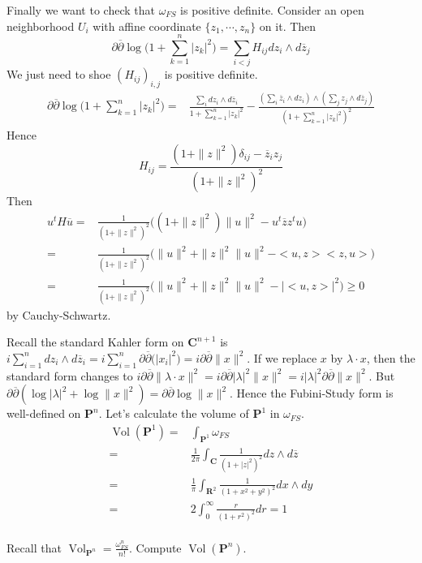 \documentclass[
11pt, %
letterpaper， %
oneside, %
headinclude,footinclude, %
BCOR5mm, %
]{scrartcl}
\newcommand{\R}{{\mathbf{R}}}
\newcommand{\C}{{\mathbf{C}}}
\newcommand{\cp}{{\mathbf{P}}}
\newcommand{\vol}{\operatorname{Vol}}
\begin{document}
\begin{ex}
Finally we want to check that $\omega_{FS}$ is positive definite. Consider an open neighborhood $U_i$ with affine coordinate $\{z_1,\cdots, z_n \}$ on it. Then 
\begin{equation*}
\partial \overline{\partial} \log \big(1+ \sum_{k=1}^{n}|z_k|^2 \big)=\sum_{i<j} H_{ij} dz_i\wedge d\overline{z}_j
\end{equation*}
We just need to shoe $(H_{ij})_{i,j}$ is positive definite.
\begin{align*}
\partial \overline{\partial} \log \big(1+ \sum_{k=1}^{n}|z_k|^2 \big)=& \frac{\sum_i dz_i\wedge d\overline{z}_i }{1+ \sum_{k=1}^{n}|z_k|^2}-\frac{(\sum_i \overline{z}_i\wedge dz_i)\wedge(\sum_j z_j\wedge d\overline{z}_j) }{(1+ \sum_{k=1}^{n}|z_k|^2)^2}
\end{align*}
Hence \begin{equation*}
 H_{ij}=\frac{(1+\|z\|^2)\delta_{ij}-\overline{z}_iz_j}{(1+\|z\|^2)^2}
\end{equation*}
Then \begin{align*}
u^t H \overline{u}=& \frac{1}{(1+\|z\|^2)^2}\big((1+\|z\|^2)\|u\|^2-u^t\overline{z}z^tu \big)\\
=&\frac{1}{(1+\|z\|^2)^2}\big(\|u\|^2+\|z\|^2\|u\|^2-<u,z><z,u> \big)\\
=&\frac{1}{(1+\|z\|^2)^2}\big(\|u\|^2+\|z\|^2\|u\|^2-|<u,z>|^2 \big)\ge 0
\end{align*}
by Cauchy-Schwartz.

\end{ex}
Recall the standard Kahler form on $\C^{n+1}$ is $i\sum_{i=1}^n dz_i\wedge d\overline{z}_i=i\sum_{i=1}^n \partial \overline{\partial} \big(|x_i|^2 \big)=i \partial \overline{\partial} \|x\|^2$. If we replace $x$ by $\lambda\cdot x$, then the standard form changes to $i \partial \overline{\partial} \|\lambda\cdot x\|^2=i \partial \overline{\partial}|\lambda |^2 \| x\|^2=i|\lambda |^2 \partial \overline{\partial} \| x\|^2$. But $\partial \overline{\partial}(\log|\lambda |^2+  \log \| x\|^2)=\partial \overline{\partial}  \log \| x\|^2$. Hence the Fubini-Study form is well-defined on $\cp^n$.
Let's calculate the volume of $\cp^1$ in $\omega_{FS}$.
\begin{align*}
\vol(\cp^1)=& \int_{\cp^1} \omega_{FS}\\
= &\frac{1}{2\pi}\int_{\C}  \frac{1}{(1+|z|^2)^2}dz\wedge d\overline{z}\\
=&\frac{1}{\pi}\int_{\R^2}  \frac{1}{(1+x^2+y^2)^2}dx\wedge dy \\
=&2\int_{0}^{\infty}  \frac{r}{(1+r^2)^2}dr =1\\
\end{align*}
\begin{ex}
	Recall that $\vol_{\cp^n}=\frac{\omega_{FS}^n}{n!}$. Compute $\vol{(\cp^n)}$.
\end{ex}
\end{document}
